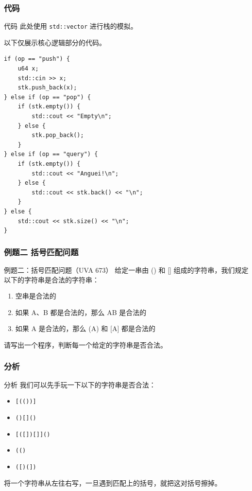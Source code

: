 \documentclass{beamer}
\begin{document}
\subsubsection{代码}
\begin{frame}[fragile]{代码}
    此处使用 \texttt{std::vector} 进行栈的模拟。

    以下仅展示核心逻辑部分的代码。

    \begin{verbatim}
if (op == "push") {
    u64 x;
    std::cin >> x;
    stk.push_back(x);
} else if (op == "pop") {
    if (stk.empty()) {
        std::cout << "Empty\n";
    } else {
        stk.pop_back();
    }
} else if (op == "query") {
    if (stk.empty()) {
        std::cout << "Anguei!\n";
    } else {
        std::cout << stk.back() << "\n";
    }
} else {
    std::cout << stk.size() << "\n";
}
    \end{verbatim}
\end{frame}

\subsubsection{例题二 括号匹配问题}
\begin{frame}{例题二：括号匹配问题（UVA 673）}
    给定一串由 () 和 [] 组成的字符串，我们规定以下的字符串是合法的字符串：
    \begin{enumerate}
        \item 空串是合法的
        \item 如果 A、B 都是合法的，那么 AB 是合法的
        \item 如果 A 是合法的，那么 (A) 和 [A] 都是合法的
    \end{enumerate}
    请写出一个程序，判断每一个给定的字符串是否合法。
\end{frame}

\subsubsection{分析}
\begin{frame}{分析}
    我们可以先手玩一下以下的字符串是否合法：

    \begin{itemize}
        \item \texttt{[(())]}
        \item \texttt{()[]()}
        \item \texttt{[([])[]]()}
        \item \texttt{(()}
        \item \texttt{([)(])}
    \end{itemize}

    将一个字符串从左往右写，一旦遇到匹配上的括号，就把这对括号擦掉。
\end{frame}
\end{document}
